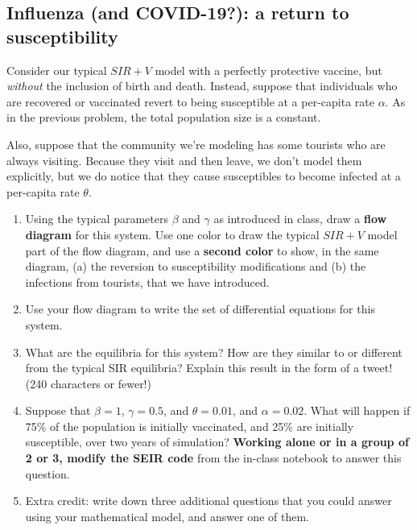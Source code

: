\documentclass[11pt,onecolumn,superscriptaddress,notitlepage]{article}
\begin{document}
\clearpage
\subsection*{Influenza (and COVID-19?): a return to susceptibility}

Consider our typical $SIR+V$ model with a perfectly protective vaccine, but {\it without} the inclusion of birth and death. Instead, suppose that individuals who are recovered or vaccinated revert to being susceptible at a per-capita rate $\alpha$. As in the previous problem, the total population size is a constant. 

Also, suppose that the community we're modeling has some tourists who are always visiting. Because they visit and then leave, we don't model them explicitly, but we do notice that they cause susceptibles to become infected at a per-capita rate $\theta$. 

\begin{enumerate}[resume]
	\item Using the typical parameters $\beta$ and $\gamma$ as introduced in class, draw a {\bf flow diagram} for this system. Use one color to draw the typical $SIR+V$ model part of the flow diagram, and use a {\bf second color} to show, in the same diagram, (a) the reversion to susceptibility modifications and (b) the infections from tourists, that we have introduced.
	\item Use your flow diagram to write the set of differential equations for this system.
	\item What are the equilibria for this system? How are they similar to or different from the typical SIR equilibria? Explain this result in the form of a tweet! (240 characters or fewer!)
	\item Suppose that $\beta=1$, $\gamma=0.5$, and $\theta=0.01$, and $\alpha=0.02$. What will happen if 75\% of the population is initially vaccinated, and 25\% are initially susceptible, over two years of simulation? {\bf Working alone or in a group of 2 or 3, modify the SEIR code} from the in-class notebook to answer this question.
	\item Extra credit: write down three additional questions that you could answer using your mathematical model, and answer one of them.
\end{enumerate}

\end{document}
